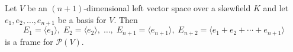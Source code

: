Let $V$ be an $(n + 1)$-dimensional left vector space over a skewfield $K$ and let $e_1, e_2, \dots, e_{n+1}$ be a basis for $V$. Then
$$E_1 = \langle e_1 \rangle,\; E_2 = \langle e_2 \rangle,\; \dots,\; E_{n+1} = \langle e_{n+1} \rangle,\; E_{n+2} = \langle e_1 + e_2 + \cdots + e_{n+1} \rangle$$
is a frame for $\mathcal{P}(V)$.
